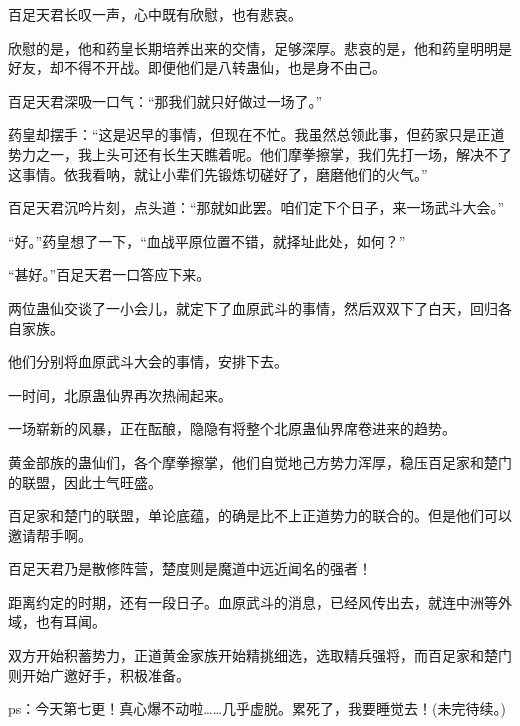 \begin{this_body}
百足天君长叹一声，心中既有欣慰，也有悲哀。

欣慰的是，他和药皇长期培养出来的交情，足够深厚。悲哀的是，他和药皇明明是好友，却不得不开战。即便他们是八转蛊仙，也是身不由己。

百足天君深吸一口气：“那我们就只好做过一场了。”

药皇却摆手：“这是迟早的事情，但现在不忙。我虽然总领此事，但药家只是正道势力之一，我上头可还有长生天瞧着呢。他们摩拳擦掌，我们先打一场，解决不了这事情。依我看呐，就让小辈们先锻炼切磋好了，磨磨他们的火气。”

百足天君沉吟片刻，点头道：“那就如此罢。咱们定下个日子，来一场武斗大会。”

“好。”药皇想了一下，“血战平原位置不错，就择址此处，如何？”

“甚好。”百足天君一口答应下来。

两位蛊仙交谈了一小会儿，就定下了血原武斗的事情，然后双双下了白天，回归各自家族。

他们分别将血原武斗大会的事情，安排下去。

一时间，北原蛊仙界再次热闹起来。

一场崭新的风暴，正在酝酿，隐隐有将整个北原蛊仙界席卷进来的趋势。

黄金部族的蛊仙们，各个摩拳擦掌，他们自觉地己方势力浑厚，稳压百足家和楚门的联盟，因此士气旺盛。

百足家和楚门的联盟，单论底蕴，的确是比不上正道势力的联合的。但是他们可以邀请帮手啊。

百足天君乃是散修阵营，楚度则是魔道中远近闻名的强者！

距离约定的时期，还有一段日子。血原武斗的消息，已经风传出去，就连中洲等外域，也有耳闻。

双方开始积蓄势力，正道黄金家族开始精挑细选，选取精兵强将，而百足家和楚门则开始广邀好手，积极准备。

ps：今天第七更！真心爆不动啦……几乎虚脱。累死了，我要睡觉去！(未完待续。)

\end{this_body}

